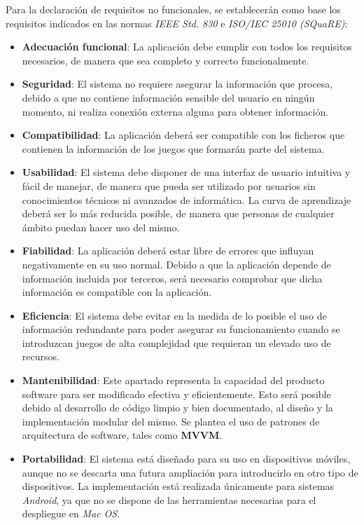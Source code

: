 Para la declaración de requisitos no funcionales, se establecerán como base los 
requisitos indicados en las normas \textit{IEEE Std. 830} e \textit{ISO/IEC 25010 (SQuaRE)}:

\begin{itemize}   
    \item \textbf{Adecuación funcional}: La aplicación debe cumplir con todos los requisitos necesarios, 
    de manera que sea completo y correcto funcionalmente.

    \item \textbf{Seguridad}: El sistema no requiere asegurar la información que procesa, debido a que 
    no contiene información sensible del usuario en ningún momento, ni realiza conexión externa alguna 
    para obtener información.
    
    \item \textbf{Compatibilidad}: La aplicación deberá ser compatible con los ficheros que contienen
    la información de los juegos que formarán parte del sistema.
    \newpage
    \item \textbf{Usabilidad}: El sistema debe disponer de una interfaz de usuario intuitiva y fácil de 
    manejar, de manera que pueda ser utilizado por usuarios sin conocimientos técnicos ni avanzados de 
    informática. La curva de aprendizaje deberá ser lo más reducida posible, de manera que personas de 
    cualquier ámbito puedan hacer uso del mismo.

    \item \textbf{Fiabilidad}: La aplicación deberá estar libre de errores que influyan negativamente 
    en su uso normal. Debido a que la aplicación depende de información incluida por terceros, será 
    necesario comprobar que dicha información es compatible con la aplicación.
    
    \item \textbf{Eficiencia}: El sistema debe evitar en la medida de lo posible el uso de información 
    redundante para poder asegurar su funcionamiento cuando se introduzcan juegos de alta complejidad 
    que requieran un elevado uso de recursos.

    \item \textbf{Mantenibilidad}: Este apartado representa la capacidad del producto software para 
    ser modificado efectiva y eficientemente. Esto será posible debido al desarrollo de código 
    limpio y bien documentado, al diseño y la implementación modular del mismo. Se plantea el uso 
    de patrones de arquitectura de software, tales como \textbf{MVVM}.

    \item \textbf{Portabilidad}: El sistema está diseñado para su uso en dispositivos móviles, 
    aunque no se descarta una futura ampliación para introducirlo en otro tipo de dispositivos.
    La implementación está realizada únicamente para sistemas \textit{Android}, ya que no 
    se dispone de las herramientas necesarias para el despliegue en \textit{Mac OS}. 
\end{itemize}
